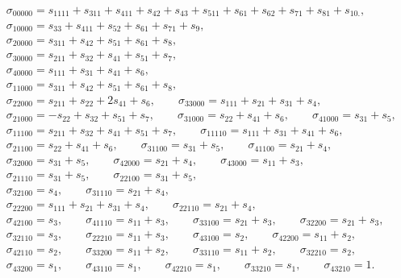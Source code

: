 \documentclass[12pt]{amsart}
\theoremstyle{plain}
\theoremstyle{definition}
\theoremstyle{remark}
\begin{document}
\begin{align*}
&
\sigma_{00000}=s_{1111} + s_{311} + s_{411} + s_{42} + s_{43} + s_{511} + s_{61} + s_{62} + s_{71} + s_{81} + s_{10.},
\\&
\sigma_{10000}=s_{33} + s_{411} + s_{52} + s_{61} + s_{71} + s_{9},
\\ &
\sigma_{20000}=s_{311} + s_{42} + s_{51} + s_{61} + s_{8},
\\&
\sigma_{30000}=s_{211} + s_{32} + s_{41} + s_{51} + s_{7},
\\&
\sigma_{40000}=s_{111} + s_{31} + s_{41} + s_{6},
\\&
\sigma_{11000}=s_{311} + s_{42} + s_{51} + s_{61} + s_{8},
\\&
\sigma_{22000}=s_{211} + s_{22} + 2s_{41} + s_{6},
\qquad
\sigma_{33000}=s_{111} + s_{21} + s_{31} + s_{4},
\\&
\sigma_{21000}=-s_{22} + s_{32} + s_{51} + s_{7},
\qquad
\sigma_{31000}=s_{22} + s_{41} + s_{6},
\qquad
\sigma_{41000}=s_{31} + s_{5},
\\&
\sigma_{11100}=s_{211} + s_{32} + s_{41} + s_{51} + s_{7},
\qquad
\sigma_{11110}=s_{111} + s_{31} + s_{41} + s_{6},
\\&
\sigma_{21100}=s_{22} + s_{41} + s_{6},
\qquad
\sigma_{31100}=s_{31} + s_{5},
\qquad
\sigma_{41100}=s_{21} + s_{4},
\\&
\sigma_{32000}=s_{31} + s_{5},
\qquad
\sigma_{42000}=s_{21} + s_{4},
\qquad
\sigma_{43000}=s_{11} + s_{3},
\\&
\sigma_{21110}=s_{31} + s_{5},
\qquad
\sigma_{22100}=s_{31} + s_{5},
\\&
\sigma_{32100}=s_{4},\qquad
\sigma_{31110}=s_{21} + s_{4},\\
&\sigma_{22200}=s_{111} + s_{21} + s_{31} + s_{4},\qquad
\sigma_{22110}=s_{21} + s_{4},
\\&
\sigma_{42100}=s_{3},\qquad
\sigma_{41110}=s_{11} + s_{3},\qquad
\sigma_{33100}=s_{21} + s_{3},\qquad
\sigma_{32200}=s_{21} + s_{3},\\
&\sigma_{32110}=s_{3},\qquad
\sigma_{22210}=s_{11} + s_{3},\qquad
\sigma_{43100}=s_{2},\qquad
\sigma_{42200}=s_{11} + s_{2},\\
&\sigma_{42110}=s_{2},\qquad
\sigma_{33200}=s_{11} + s_{2},\qquad
\sigma_{33110}=s_{11} + s_{2},
\qquad
\sigma_{32210}=s_{2},
\\&
\sigma_{43200}=s_{1},\qquad
\sigma_{43110}=s_{1},\qquad
\sigma_{42210}=s_{1},\qquad
\sigma_{33210}=s_{1},\qquad
\sigma_{43210}=1.
\end{align*}
\end{document}
